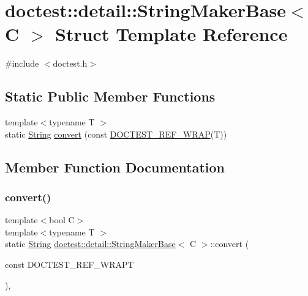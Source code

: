 \hypertarget{structdoctest_1_1detail_1_1_string_maker_base}{}\section{doctest\+:\+:detail\+:\+:String\+Maker\+Base$<$ C $>$ Struct Template Reference}
\label{structdoctest_1_1detail_1_1_string_maker_base}


{\ttfamily \#include $<$doctest.\+h$>$}

\subsection*{Static Public Member Functions}
\begin{DoxyCompactItemize}
\item 
{\footnotesize template$<$typename T $>$ }\\static \hyperlink{classdoctest_1_1_string}{String} \hyperlink{structdoctest_1_1detail_1_1_string_maker_base_a67d29f2a5de9a522d8e8607c1a39db9b}{convert} (const \hyperlink{doctest_8h_af2901cafb023c57fb672ccb1bf14f2eb}{D\+O\+C\+T\+E\+S\+T\+\_\+\+R\+E\+F\+\_\+\+W\+R\+AP}(T))
\end{DoxyCompactItemize}


\subsection{Member Function Documentation}
\mbox{\label{structdoctest_1_1detail_1_1_string_maker_base_a67d29f2a5de9a522d8e8607c1a39db9b}} 
\subsubsection{\texorpdfstring{convert()}{convert()}}
{\footnotesize\ttfamily template$<$bool C$>$ \\
template$<$typename T $>$ \\
static \hyperlink{classdoctest_1_1_string}{String} \hyperlink{structdoctest_1_1detail_1_1_string_maker_base}{doctest\+::detail\+::\+String\+Maker\+Base}$<$ C $>$\+::convert (\begin{DoxyParamCaption}\item[{const }]{D\+O\+C\+T\+E\+S\+T\+\_\+\+R\+E\+F\+\_\+\+W\+R\+APT }\end{DoxyParamCaption})\hspace{0.3cm}{\ttfamily [inline]}, {\ttfamily [static]}}

